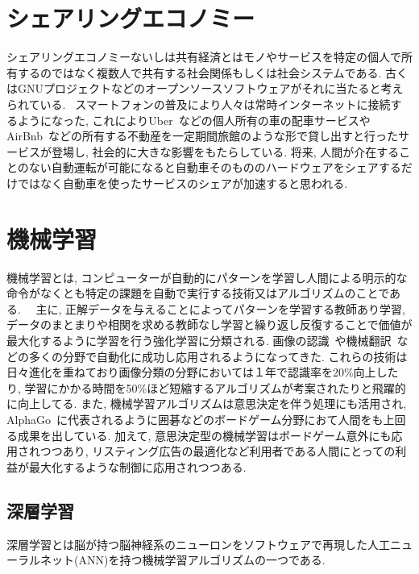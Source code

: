 \section{シェアリングエコノミー}

シェアリングエコノミー\cite{Sharing}ないしは共有経済とはモノやサービスを特定の個人で所有するのではなく複数人で共有する社会関係もしくは社会システムである.
古くはGNUプロジェクトなどのオープンソースソフトウェアがそれに当たると考えられている.~\cite{GNU}
スマートフォンの普及により人々は常時インターネットに接続するようになった, これによりUber~\cite{Uber}などの個人所有の車の配車サービスやAirBnb~\cite{AirBnB}などの所有する不動産を一定期間旅館のような形で貸し出すと行ったサービスが登場し,
社会的に大きな影響をもたらしている.
将来, 人間が介在することのない自動運転が可能になると自動車そのもののハードウェアをシェアするだけではなく自動車を使ったサービスのシェアが加速すると思われる.


\section{機械学習}

機械学習とは, コンピューターが自動的にパターンを学習し人間による明示的な命令がなくとも特定の課題を自動で実行する技術又はアルゴリズムのことである.~\cite{MachineLearning}~\cite{MachineLearning2}
主に, 正解データを与えることによってパターンを学習する教師あり学習,
データのまとまりや相関を求める教師なし学習と繰り返し反復することで価値が最大化するように学習を行う強化学習に分類される.
画像の認識~\cite{ImageRecognization}や機械翻訳~\cite{Translation}などの多くの分野で自動化に成功し応用されるようになってきた.
これらの技術は日々進化を重ねており画像分類の分野においては１年で認識率を20\%向上したり, 学習にかかる時間を50\%ほど短縮するアルゴリズムが考案されたりと飛躍的に向上してる.
また, 機械学習アルゴリズムは意思決定を伴う処理にも活用され, AlphaGo~\cite{AlphaGo}に代表されるように囲碁などのボードゲーム分野におて人間をも上回る成果を出している.
加えて, 意思決定型の機械学習はボードゲーム意外にも応用されつつあり, リスティング広告の最適化など利用者である人間にとっての利益が最大化するような制御に応用されつつある.
 


\subsection{深層学習}

深層学習とは脳が持つ脳神経系のニューロンをソフトウェアで再現した人工ニューラルネット(ANN)を持つ機械学習アルゴリズムの一つである.


